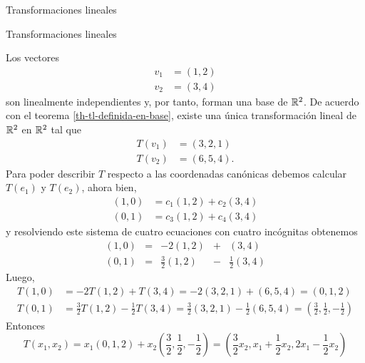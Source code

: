 \begin{chapter}{Transformaciones lineales}
\begin{section}{Transformaciones lineales}
        \begin{ejemplo*}
            Los vectores
            \begin{align*}
                v_1 &= (1,2)\\
                v_2 &= (3,4)
            \end{align*}
            son linealmente independientes y, por tanto, forman una base de $\mathbb R^2$. De acuerdo con el teorema \ref{th-tl-definida-en-base}, existe una única transformación lineal de $\mathbb R^2$ en $\mathbb R^2$ tal que
            \begin{align*}
                T(v_1) &= (3,2, 1) \\
                T(v_2) &= (6, 5,4).
            \end{align*}
            Para poder describir $T$ respecto a las coordenadas canónicas debemos calcular $T(e_1)$ y $T(e_2)$,  ahora bien,
            \begin{align*}
            (1,0) &= c_{1}(1,2) + c_{2}(3,4)\\
            (0,1) &= c_{3}(1,2) + c_{4}(3,4)
            \end{align*}
            y resolviendo este sistema de cuatro ecuaciones con cuatro incógnitas obtenemos
            \begin{equation*}
            \begin{array}{rcrcr}
            (1,0) &=& -2(1,2) &+ &(3,4)\\
            (0,1) &=& \displaystyle\frac32(1,2) &- &\displaystyle\frac12(3,4)
            \end{array}
            \end{equation*}
            Luego, 
                \begin{align*}
            T(1,0) &= -2T(1,2)+ T(3,4) = -2(3,2, 1)+(6, 5,4) = (0,1,2)\\
            T(0,1) &= \displaystyle\frac32T(1,2) - \displaystyle\frac12T(3,4) = \displaystyle\frac32(3,2,1) - \displaystyle\frac12(6, 5,4)= (\displaystyle\frac32,\displaystyle\frac12,-\displaystyle\frac12)
            \end{align*}
            Entonces
                \begin{equation*}
            T(x_1,x_2) = x_1(0,1,2) + x_2		 (\displaystyle\frac32,\displaystyle\frac12,-\displaystyle\frac12)
            = (\displaystyle\frac32x_2,x_1+\displaystyle\frac12x_2,2x_1-\displaystyle\frac12x_2)
            \end{equation*}
        \end{ejemplo*}
        

\end{section}
\end{chapter}
